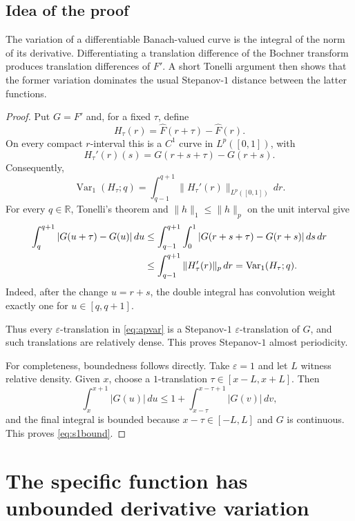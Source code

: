 \documentclass[11pt]{article}
\newcommand{\R}{\mathbb R}
\newcommand{\Var}{\operatorname{Var}}
\begin{document}
\subsection*{Idea of the proof}

The variation of a differentiable Banach-valued curve is the integral of
the norm of its derivative.  Differentiating a translation difference of
the Bochner transform produces translation differences of $F'$.  A short
Tonelli argument then shows that the former variation dominates the usual
Stepanov-$1$ distance between the latter functions.

\begin{proof}
Put $G=F'$ and, for a fixed $\tau$, define
\[
 H_\tau(r)=\widehat F(r+\tau)-\widehat F(r).
\]
On every compact $r$-interval this is a $C^1$ curve in $L^p([0,1])$, with
\[
 H_\tau'(r)(s)=G(r+s+\tau)-G(r+s).
\]
Consequently,
\begin{equation}\label{eq:variationidentity}
 \Var_1(H_\tau;q)=\int_{q-1}^{q+1}\|H_\tau'(r)\|_{L^p([0,1])}\,dr.
\end{equation}
For every $q\in\R$, Tonelli's theorem and
$\|h\|_1\leq\|h\|_p$ on the unit interval give
\begin{align}
 \int_q^{q+1}|G(u+\tau)-G(u)|\,du
 &\leq \int_{q-1}^{q+1}\int_0^1
       |G(r+s+\tau)-G(r+s)|\,ds\,dr \notag\\
 &\leq \int_{q-1}^{q+1}\|H_\tau'(r)\|_p\,dr
  =\Var_1(H_\tau;q).                                      \label{eq:key}
\end{align}
Indeed, after the change $u=r+s$, the double integral has convolution
weight exactly one for $u\in[q,q+1]$.

Thus every $\varepsilon$-translation in \eqref{eq:apvar} is a
Stepanov-$1$ $\varepsilon$-translation of $G$, and such translations are
relatively dense.  This proves Stepanov-$1$ almost periodicity.

For completeness, boundedness follows directly.  Take $\varepsilon=1$ and
let $L$ witness relative density.  Given $x$, choose a $1$-translation
$\tau\in[x-L,x+L]$.  Then
\[
 \int_x^{x+1}|G(u)|\,du
 \leq 1+\int_{x-\tau}^{x-\tau+1}|G(v)|\,dv,
\]
and the final integral is bounded because $x-\tau\in[-L,L]$ and $G$ is
continuous.  This proves \eqref{eq:s1bound}.
\end{proof}

\section{The specific function has unbounded derivative variation}
\end{document}
